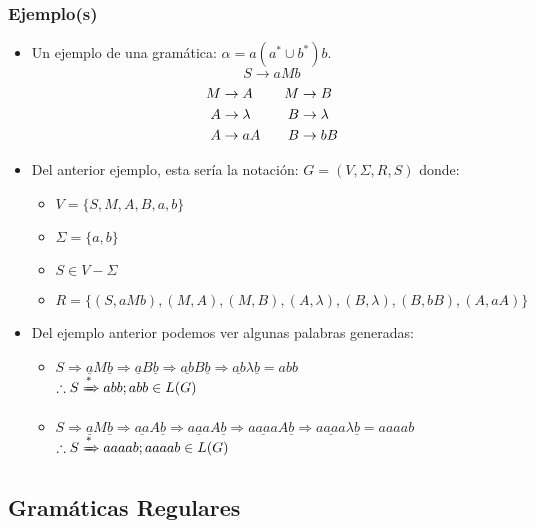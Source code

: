 \subsubsection{Ejemplo(s)}
\begin{itemize}
\item Un ejemplo de una gramática: $\alpha = a(a^* \cup b^* ) b$.
$$
S \rightarrow aMb
$$
\begin{align*}
M &\rightarrow A & \hspace{0.25cm} M&\rightarrow B \\
A &\rightarrow \lambda & \hspace{0.25cm} B&\rightarrow \lambda \\
A &\rightarrow aA & \hspace{0.25cm}  B&\rightarrow bB \\
\end{align*}
\item Del anterior ejemplo, esta sería la notación: $G=(V,\Sigma,R,S)$ donde:
\begin{itemize}
\item $V=\{ S,M,A,B,a,b \}$
\item $\Sigma =\{ a,b \}$ 
\item $S\in V-\Sigma$
\item $R = \{ (S,aMb),(M,A),(M,B),(A,\lambda),(B,\lambda),(B,bB),(A,aA) \}$
\end{itemize}
\item Del ejemplo anterior podemos ver algunas palabras generadas:
\begin{itemize}
\item $S \Rightarrow  \underline{a}M\underline{b} 
	   \Rightarrow  \underline{a}B\underline{b} 
	   \Rightarrow  \underline{ab}B\underline{b} 
	   \Rightarrow  \underline{ab}\lambda\underline{b} 
	   =  abb
	$
	\\${ }$\\
	$ \therefore S \xRightarrow[\text{}]{\text{*}} abb ; abb\in L(G) $
\item $S \Rightarrow  \underline{a}M\underline{b} 
	   \Rightarrow  \underline{aa}A\underline{b} 
	   \Rightarrow  \underline{aaa}A\underline{b} 
	   \Rightarrow  \underline{aaaa}A\underline{b} 
	   \Rightarrow  \underline{aaaa}\lambda\underline{b} 
	   =  aaaab
	$
	\\${ }$\\
	$ \therefore S \xRightarrow[\text{}]{\text{*}} aaaab ; aaaab\in L(G) $
\end{itemize}
\end{itemize}
\subsection{Gramáticas Regulares}
